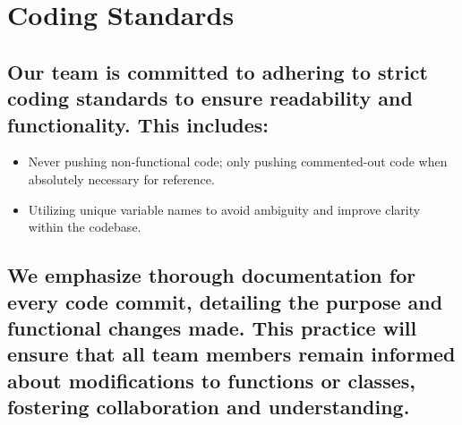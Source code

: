 \section{Coding Standards} \subsection{Our team is committed to adhering to strict coding standards to ensure readability and functionality. This includes: } \begin{itemize} \item Never pushing non-functional code; only pushing commented-out code when absolutely necessary for reference. \item Utilizing unique variable names to avoid ambiguity and improve clarity within the codebase. \end{itemize}

\subsection{We emphasize thorough documentation for every code commit, detailing the purpose and functional changes made. This practice will ensure that all team members remain informed about modifications to functions or classes, fostering collaboration and understanding.}


